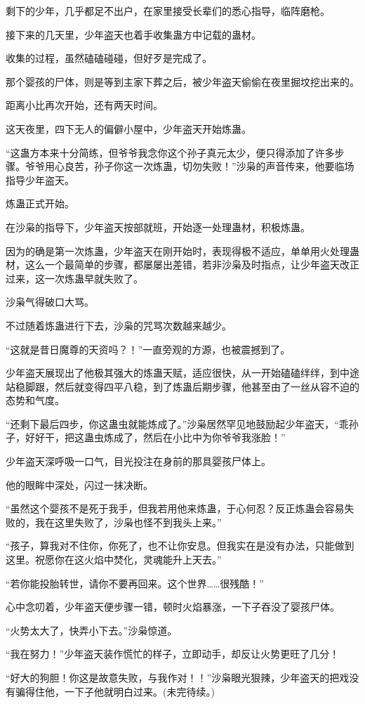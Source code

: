 \begin{this_body}
剩下的少年，几乎都足不出户，在家里接受长辈们的悉心指导，临阵磨枪。

接下来的几天里，少年盗天也着手收集蛊方中记载的蛊材。

收集的过程，虽然磕磕碰碰，但好歹是完成了。

那个婴孩的尸体，则是等到主家下葬之后，被少年盗天偷偷在夜里掘坟挖出来的。

距离小比再次开始，还有两天时间。

这天夜里，四下无人的偏僻小屋中，少年盗天开始炼蛊。

“这蛊方本来十分简练，但爷爷我念你这个孙子真元太少，便只得添加了许多步骤。爷爷用心良苦，孙子你这一次炼蛊，切勿失败！”沙枭的声音传来，他要临场指导少年盗天。

炼蛊正式开始。

在沙枭的指导下，少年盗天按部就班，开始逐一处理蛊材，积极炼蛊。

因为的确是第一次炼蛊，少年盗天在刚开始时，表现得极不适应，单单用火处理蛊材，这么一个最简单的步骤，都屡屡出差错，若非沙枭及时指点，让少年盗天改正过来，这一次炼蛊早就失败了。

沙枭气得破口大骂。

不过随着炼蛊进行下去，沙枭的咒骂次数越来越少。

“这就是昔日魔尊的天资吗？！”一直旁观的方源，也被震撼到了。

少年盗天展现出了他极其强大的炼蛊天赋，适应很快，从一开始磕磕绊绊，到中途站稳脚跟，然后就变得四平八稳，到了炼蛊后期步骤，他甚至由了一丝从容不迫的态势和气度。

“还剩下最后四步，你这蛊虫就能炼成了。”沙枭居然罕见地鼓励起少年盗天，“乖孙子，好好干，把这蛊虫炼成了，然后在小比中为你爷爷我涨脸！”

少年盗天深呼吸一口气，目光投注在身前的那具婴孩尸体上。

他的眼眸中深处，闪过一抹决断。

“虽然这个婴孩不是死于我手，但我若用他来炼蛊，于心何忍？反正炼蛊会容易失败的，我在这里失败了，沙枭也怪不到我头上来。”

“孩子，算我对不住你，你死了，也不让你安息。但我实在是没有办法，只能做到这里。祝愿你在这火焰中焚化，灵魂能升上天去。”

“若你能投胎转世，请你不要再回来。这个世界……很残酷！”

心中念叨着，少年盗天便步骤一错，顿时火焰暴涨，一下子吞没了婴孩尸体。

“火势太大了，快弄小下去。”沙枭惊道。

“我在努力！”少年盗天装作慌忙的样子，立即动手，却反让火势更旺了几分！

“好大的狗胆！你这是故意失败，与我作对！！”沙枭眼光狠辣，少年盗天的把戏没有骗得住他，一下子他就明白过来。(未完待续。)

\end{this_body}

